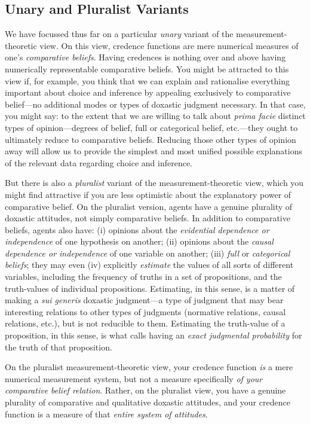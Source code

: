 \subsection{Unary and Pluralist Variants}

We have focussed thus far on a particular \textit{unary} variant of the measurement-theoretic view. On this view, credence functions are mere numerical measures of one's \textit{comparative beliefs}. Having credences is nothing over and above having numerically representable comparative beliefs. You might be attracted to this view if, for example, you think that we can explain and rationalise everything important about choice and inference by appealing exclusively to comparative belief---no additional modes or types of doxastic judgment necessary. In that case, you might say: to the extent that we are willing to talk about \textit{prima facie} distinct types of opinion---degrees of belief, full or categorical belief, etc.---they ought to ultimately reduce to comparative beliefs. Reducing those other types of opinion away will allow us to provide the simplest and most unified possible explanations of the relevant data regarding choice and inference.

But there is also a \textit{pluralist} variant of the measurement-theoretic view, which you might find attractive if you are less optimistic about the explanatory power of comparative belief. On the pluralist version, agents have a genuine plurality of doxastic attitudes, not simply comparative beliefs. In addition to comparative beliefs, agents also have: (i) opinions about the \emph{evidential dependence or independence} of one hypothesis on another; (ii) opinions about the \emph{causal dependence or independence} of one variable on another; (iii) \emph{full} or \textit{categorical beliefs}; they may even (iv) explicitly \emph{estimate} the values of all sorts of different variables, including the frequency of truths in a set of propositions, and the truth-values of individual propositions. Estimating, in this sense, is a matter of making a \emph{sui generis} doxastic judgment---a type of judgment that may bear interesting relations to other types of judgments (normative relations, causal relations, etc.), but is not reducible to them. Estimating the truth-value of a proposition, in this sense, is what \citet{Jeffrey2002} calls having an \emph{exact judgmental probability} for the truth of that proposition.

On the pluralist measurement-theoretic view, your credence function \textit{is} a mere numerical measurement system, but not a measure specifically \emph{of your comparative belief relation}. Rather, on the pluralist view, you have a genuine plurality of comparative and qualitative doxastic attitudes, and your credence function is a measure of that \emph{entire system of attitudes}.

